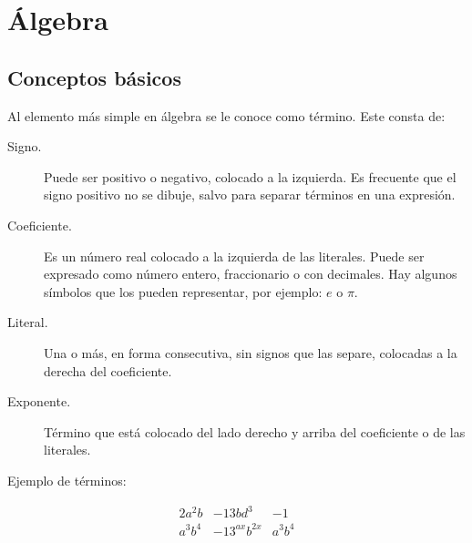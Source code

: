 \chapter{Álgebra}
\section{Conceptos básicos}
Al elemento más simple en álgebra se le conoce como término. Este consta de:
\begin{description}
\item[Signo.] Puede ser positivo o negativo, colocado a la izquierda. Es frecuente que el signo positivo no se dibuje, salvo para separar términos en una expresión.
\item[Coeficiente.] Es un número real colocado a la izquierda de las literales. Puede ser expresado como número entero, fraccionario o con decimales. Hay algunos símbolos que los pueden representar, por ejemplo: $e$ o $\pi$.
\item[Literal.] Una o más, en forma consecutiva, sin signos que las separe, colocadas a la derecha del coeficiente.
\item[Exponente.]Término que está colocado del lado derecho y arriba del coeficiente o de las literales.
\end{description}
Ejemplo de términos:
\begin{center}
$$
\begin{array}{ccc}
2a^2b & -13bd^3 & -1\\
a^3b^4 & -13^{ax}b^{2x} & a^3b^4
\end{array}
$$
\end{center}
